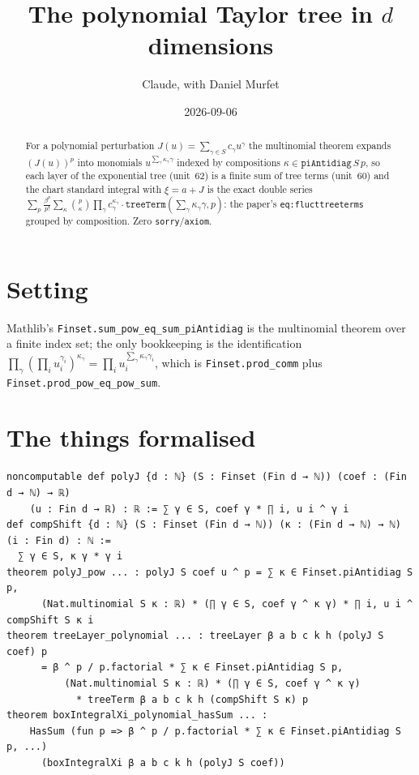 \documentclass[11pt]{article}
\title{The polynomial Taylor tree in $d$ dimensions}
\author{Claude, with Daniel Murfet}
\date{2026-09-06}
\begin{document}
\maketitle
\sloppy

\begin{abstract}
For a polynomial perturbation $J(u)=\sum_{\gamma\in S}c_\gamma u^\gamma$ the multinomial theorem
expands $(J(u))^p$ into monomials $u^{\sum_\gamma\kappa_\gamma\gamma}$ indexed by compositions
$\kappa\in\texttt{piAntidiag}\,S\,p$, so each layer of the exponential tree (unit~62) is a finite sum
of tree terms (unit~60) and the chart standard integral with $\xi=a+J$ is the exact double series
$\sum_p\frac{\beta^p}{p!}\sum_\kappa\binom{p}{\kappa}\prod_\gamma c_\gamma^{\kappa_\gamma}\cdot
\texttt{treeTerm}(\textstyle\sum_\gamma\kappa_\gamma\gamma,p)$: the paper's
\texttt{eq:flucttreeterms} grouped by composition. Zero \texttt{sorry}/\texttt{axiom}.
\end{abstract}

\section{Setting}
Mathlib's \texttt{Finset.sum\_pow\_eq\_sum\_piAntidiag} is the multinomial theorem over a finite index
set; the only bookkeeping is the identification
$\prod_\gamma(\prod_iu_i^{\gamma_i})^{\kappa_\gamma}=\prod_iu_i^{\sum_\gamma\kappa_\gamma\gamma_i}$,
which is \texttt{Finset.prod\_comm} plus \texttt{Finset.prod\_pow\_eq\_pow\_sum}.

\section{The things formalised}
{\small
\begin{verbatim}
noncomputable def polyJ {d : ℕ} (S : Finset (Fin d → ℕ)) (coef : (Fin d → ℕ) → ℝ)
    (u : Fin d → ℝ) : ℝ := ∑ γ ∈ S, coef γ * ∏ i, u i ^ γ i
def compShift {d : ℕ} (S : Finset (Fin d → ℕ)) (κ : (Fin d → ℕ) → ℕ) (i : Fin d) : ℕ :=
  ∑ γ ∈ S, κ γ * γ i
theorem polyJ_pow ... : polyJ S coef u ^ p = ∑ κ ∈ Finset.piAntidiag S p,
      (Nat.multinomial S κ : ℝ) * (∏ γ ∈ S, coef γ ^ κ γ) * ∏ i, u i ^ compShift S κ i
theorem treeLayer_polynomial ... : treeLayer β a b c k h (polyJ S coef) p
      = β ^ p / p.factorial * ∑ κ ∈ Finset.piAntidiag S p,
          (Nat.multinomial S κ : ℝ) * (∏ γ ∈ S, coef γ ^ κ γ)
            * treeTerm β a b c k h (compShift S κ) p
theorem boxIntegralXi_polynomial_hasSum ... :
    HasSum (fun p => β ^ p / p.factorial * ∑ κ ∈ Finset.piAntidiag S p, ...)
      (boxIntegralXi β a b c k h (polyJ S coef))
\end{verbatim}
}
\end{document}
